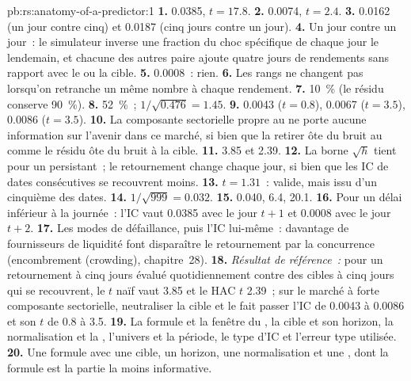 \begin{solution}{pb:rs:anatomy-of-a-predictor:1}
\textbf{1.} 0.0385, $t = 17.8$. \textbf{2.} 0.0074, $t = 2.4$. \textbf{3.} 0.0162 (un jour contre cinq) et 0.0187 (cinq jours contre
un jour). \textbf{4.} Un jour contre un jour~: le simulateur inverse une fraction du choc spécifique de chaque jour le lendemain, et chacune des autres
paire ajoute quatre jours de rendements sans rapport avec le  ou la cible. \textbf{5.} 0.0008~: rien. \textbf{6.} Les rangs ne changent pas
lorsqu'on retranche un même nombre à chaque rendement. \textbf{7.} 10~\% (le résidu conserve 90~\%). \textbf{8.} 52~\%~; $1/\sqrt{0.476} = 1.45$.
\textbf{9.} 0.0043 ($t = 0.8$), 0.0067 ($t = 3.5$), 0.0086 ($t = 3.5$). \textbf{10.} La composante sectorielle propre au  ne porte aucune
information sur l'avenir dans ce marché, si bien que la retirer ôte du bruit au  comme le résidu ôte du bruit
à la cible. \textbf{11.} 3.85 et 2.39. \textbf{12.} La borne $\sqrt h$ tient pour un  persistant~; le retournement change chaque jour, si bien que
les IC de dates consécutives se recouvrent moins. \textbf{13.} $t = 1.31$~: valide, mais issu d'un cinquième des dates. \textbf{14.} $1/\sqrt{999} =
0.032$. \textbf{15.} 0.040, 6.4, 20.1. \textbf{16.} Pour un délai inférieur à la journée~: l'IC vaut 0.0385 avec le jour $t+1$ et 0.0008 avec le jour $t+2$.
\textbf{17.} Les modes de défaillance, puis l'IC lui-même~: davantage de fournisseurs de liquidité font disparaître le retournement par la concurrence (encombrement (crowding), chapitre~28).
\textbf{18.} \emph{Résultat de référence~:} pour un retournement à cinq jours évalué quotidiennement contre des cibles à cinq jours qui se recouvrent, le $t$ naïf vaut 3.85 et le
HAC $t$ 2.39~; sur le marché à forte composante sectorielle, neutraliser la cible et le  fait passer l'IC de 0.0043 à 0.0086 et son $t$
de 0.8 à 3.5. \textbf{19.} La formule et la fenêtre du , la cible et son horizon, la normalisation et la ,
l'univers et la période, le type d'IC et l'erreur type utilisée. \textbf{20.} Une formule avec une cible, un horizon, une normalisation et
une , dont la formule est la partie la moins informative.
\end{solution}

